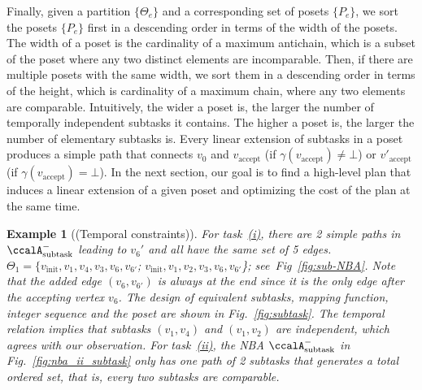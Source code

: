 \documentclass[Afour,sageh,times]{sagej}
\newtheorem{exmp}{Example}
\newcommand{\auto}[1]{\ccalA_{\text{#1}}}
\newenvironment{cexmp}
{\addtocounter{exmp}{-1}\begin{exmp}}
  {\end{exmp}}
\begin{document}
{Finally, given a partition $\{\Theta_e\}$ and a corresponding set of posets $\{P_e\}$, we sort the posets  $\{P_e\}$ first in a descending order in terms of the width of the posets. The width of a poset  is the cardinality of a maximum antichain, which is a subset of the poset where any two distinct elements are incomparable. Then, if there are multiple posets with the same width, we sort them in a descending order in terms of the height, which is cardinality of a maximum chain, where any two elements are comparable. Intuitively, the wider a poset is, the larger the number of temporally independent subtasks it contains. The higher a poset is, the  larger the number of elementary subtasks is.} Every linear extension of subtasks in a poset produces a simple path that connects $v_0$ and $v_{\text{accept}}$ (if $\gamma(v_{\text{accept}}) \neq \bot$) or $v'_{\text{accept}}$ (if $\gamma(v_{\text{accept}}) = \bot$). In the next section, our goal is to find a high-level plan that induces a linear extension of a given poset and optimizing the cost of the plan at the same time.

\begin{cexmp}[(Temporal constraints)]
  For task~\hyperref[task:i]{\it (i)}, there are 2 simple paths in $\auto{subtask}^-$ leading to $v_6'$ and all have the same set of 5 edges.  $\Theta_1 = \{v_\text{init},v_1, v_4,v_3,v_6,v_{6'}$; $v_\text{init}, v_1, v_2,v_3, v_6, v_{6'}$\}; see~Fig~\ref{fig:sub-NBA}. Note that the added edge $(v_6, v_{6'})$ is always at the end since it is the only edge after the accepting vertex $v_6$. The design of equivalent subtasks, mapping function, integer sequence and the poset are shown in Fig.~\ref{fig:subtask}. The temporal relation implies that subtasks $(v_1, v_4)$ and $(v_1, v_2)$ are independent, which agrees with our observation. For task~\hyperref[task:ii]{\it (ii)}, the NBA $\auto{subtask}^-$ in Fig.~\ref{fig:nba_ii_subtask} only has one path of 2 subtasks that generates a total ordered set, that is, every two subtasks are comparable.
\end{cexmp}

\end{document}
